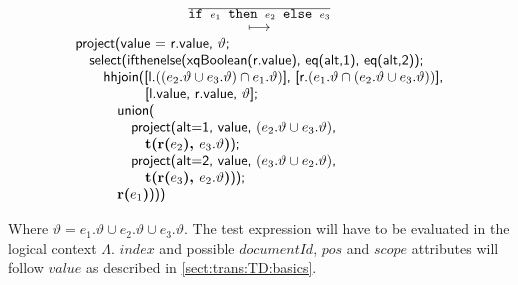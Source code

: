 \begin{equation}
\begin{array}{c}
\frac{}{\mbox{\texttt{if }}e_1\mbox{\texttt{ then }}e_2\mbox{\texttt{ else }}e_3} \\
\longmapsto \\
\begin{array}{l}
\mbox{\textsf{project(value = r.value, }}\vartheta\mbox{\textsf{;}} \\ \quad
\mbox{\textsf{select(ifthenelse(xqBoolean(r.value), eq(alt,1), eq(alt,2));}} \\ \quad \quad
\mbox{\textsf{hhjoin([l.}}((e_2.\vartheta \cup e_3.\vartheta)\cap e_1.\vartheta)\mbox{\textsf{],
[r.}}(e_1.\vartheta\cap (e_2.\vartheta\cup e_3.\vartheta))
\mbox{\textsf{],}} 
\\  \quad \quad \quad \quad \quad\mbox{\textsf{[l.value, r.value, }}\vartheta\mbox{\textsf{];}}\\\quad\quad\quad
\mbox{\textsf{union(}} \\ \quad\quad\quad\quad
\mbox{\textsf{project(alt=1, value, }}(e_2.\vartheta \cup e_3.\vartheta)\mbox{\textsf{,}}\\\quad\quad\quad\quad\quad
\mbox{\textbf{t(r(}}e_2\mbox{\textbf{), }}e_3.\vartheta\mbox{\textbf{)}\textsf{);}} \\ \quad\quad\quad\quad
\mbox{\textsf{project(alt=2, value, }}(e_3.\vartheta\cup e_2.\vartheta)\mbox{\textsf{,}}\\\quad\quad\quad\quad\quad
\mbox{\textbf{t(r(}}e_3\mbox{\textbf{), }}e_2.\vartheta\mbox{\textbf{)}\textsf{));}}\\\quad\quad\quad
\mbox{\textbf{r(}}e_1\mbox{\textbf{)}\textsf{)))}}
\end{array}
\end{array}
\label{rule:trans:TD:conditional}
\end{equation}

Where $\vartheta = e_1.\vartheta \cup e_2.\vartheta \cup e_3.\vartheta$. The test expression will have to be
evaluated in the logical context $\Lambda$. $index$ and possible $documentId$, $pos$ and $scope$ attributes will
follow $value$ as described in \ref{sect:trans:TD:basics}.

